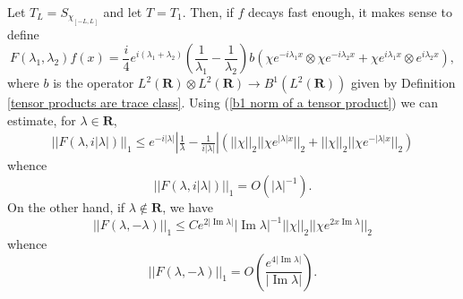 \documentclass[12pt]{report}
\newcommand{\RR}{\mathbf{R}}
\renewcommand{\Im}{\operatorname{Im}}
\theoremstyle{definition}
\begin{document}
Let $T_L = S_{\chi_{[-L, L]}}$ and let $T = T_1$. Then, if $f$ decays fast enough, it makes sense to define
$$F(\lambda_1, \lambda_2)f(x) = \frac{i}{4}e^{i(\lambda_1 + \lambda_2)}\left(\frac{1}{\lambda_1} - \frac{1}{\lambda_2}\right)b(\chi e^{-i\lambda_1x} \otimes \chi e^{-i\lambda_2x} + \chi e^{i\lambda_1x} \otimes e^{i\lambda_2x}),$$
where $b$ is the operator $L^2(\RR) \otimes L^2(\RR) \to B^1(L^2(\RR))$ given by Definition \ref{tensor products are trace class}. Using (\ref{b1 norm of a tensor product}) we can estimate, for $\lambda \in \RR$,
\begin{align*}
||F(\lambda, i|\lambda|)||_1 \leq e^{-i|\lambda|}\left|\frac{1}{\lambda} - \frac{1}{i|\lambda|}\right|(||\chi||_2 ||\chi e^{|\lambda| x}||_2 + ||\chi||_2 ||\chi e^{-|\lambda|x}||_2)
\end{align*}
whence
\begin{equation}
\label{estimate on F}
||F(\lambda, i|\lambda|)||_1 = O(|\lambda|^{-1}).
\end{equation}
On the other hand, if $\lambda \notin \RR$, we have
$$||F(\lambda, -\lambda)||_1 \leq Ce^{2|\Im \lambda|}|\Im \lambda|^{-1}||\chi||_2||\chi e^{2x\Im \lambda}||_2$$
whence
\begin{equation}
  \label{imaginary estimate on F}
  ||F(\lambda, -\lambda)||_1 = O\left(\frac{e^{4 |\Im \lambda|}}{|\Im \lambda|}\right).
\end{equation}
\end{document}

